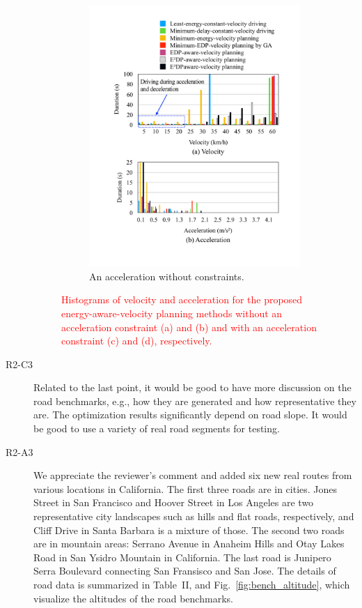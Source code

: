 \documentclass[onecolumn]{IEEEconf}
\begin{document}
\begin{description}
\begin{figure}[h!]
\begin{subfigure}{0.45\textwidth}
	\includegraphics[width=\hsize]{Figures/Histogram_acc.pdf}
	\caption{An acceleration without constraints.}
	\label{fig:histogram_acc}
	\end{subfigure}
\caption{\textcolor{red}{Histograms of velocity and acceleration for the proposed energy-aware-velocity planning methods without an acceleration constraint (a) and (b) and with an acceleration constraint (c) and (d), respectively.}}
\label{fig:histogram}
\end{figure}

\item [R2-C3] Related to the last point, it would be good to have more discussion on the road benchmarks, e.g., how they are generated and how representative they are. The optimization results significantly depend on road slope. It would be good to use a variety of real road segments for testing.

\item [R2-A3] We appreciate the reviewer's comment and added six new real routes from various locations in California.  The first three roads are in cities. Jones Street in San Francisco and Hoover Street in Los Angeles are two representative city landscapes such as hills and flat roads, respectively, and Cliff Drive in Santa Barbara is a mixture of those. The second two roads are in mountain areas: Serrano Avenue in Anaheim Hills and Otay Lakes Road in San Ysidro Mountain in California. The last road is Junipero Serra Boulevard connecting San Fransisco and San Jose. The details of road data is summarized in Table~II, and Fig.~\ref{fig:bench_altitude}, which visualize the altitudes of the road benchmarks.


\end{description}
\end{document}
